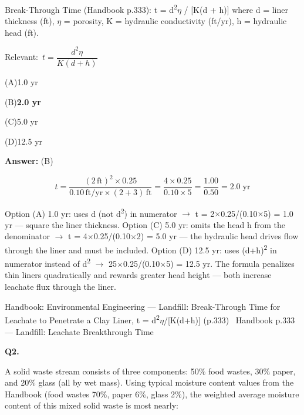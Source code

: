 \documentclass[11pt]{article}
\newcommand{\correct}[1]{\textbf{#1}\;{\color{accent}$\checkmark$}}
\newcommand{\optline}[2]{\par\noindent\hspace{1.2em}(#1)\hspace{0.6em}#2}
\begin{document}
Break-Through Time (Handbook p.333):
t = d\textsuperscript{2}$\eta$ / [K(d + h)]
where d = liner thickness (ft), $\eta$ = porosity, K = hydraulic conductivity (ft/yr), h = hydraulic head (ft).\par\vspace{3pt}
{\small\color{soft}Relevant:}\ $t = \dfrac{d^2 \eta}{K(d + h)}$\par\vspace{3pt}
\optline{A}{1.0 yr}
\optline{B}{\correct{2.0 yr}}
\optline{C}{5.0 yr}
\optline{D}{12.5 yr}
\par\vspace{3pt}
\vspace{2pt}\par\noindent\colorbox{boxbg}{\parbox{\dimexpr\linewidth-2\fboxsep\relax}{%
\vspace{2pt}\textbf{Answer:} (B)\par\vspace{2pt}
{\small \[t = \frac{(2\,\text{ft})^2 \times 0.25}{0.10\,\text{ft/yr}\times(2+3)\,\text{ft}} = \frac{4 \times 0.25}{0.10 \times 5} = \frac{1.00}{0.50} = 2.0\;\text{yr}\]

Option (A) 1.0 yr: uses d (not d\textsuperscript{2}) in numerator $\rightarrow$ t = 2$\times$0.25/(0.10$\times$5) = 1.0 yr --- square the liner thickness. Option (C) 5.0 yr: omits the head h from the denominator $\rightarrow$ t = 4$\times$0.25/(0.10$\times$2) = 5.0 yr --- the hydraulic head drives flow through the liner and must be included. Option (D) 12.5 yr: uses (d+h)\textsuperscript{2} in numerator instead of d\textsuperscript{2} $\rightarrow$ 25$\times$0.25/(0.10$\times$5) = 12.5 yr. The formula penalizes thin liners quadratically and rewards greater head height --- both increase leachate flux through the liner.}\par\vspace{2pt}
{\footnotesize\color{soft}Handbook: Environmental Engineering --- Landfill: Break-Through Time for Leachate to Penetrate a Clay Liner, t = d\textsuperscript{2}$\eta$/[K(d+h)] (p.333) \textbullet\ Handbook p.333 --- Landfill: Leachate Breakthrough Time}\vspace{2pt}
}}
\vspace{9pt}
\filbreak
\textbf{\color{accent}Q2.}\par\vspace{2pt}
A solid waste stream consists of three components: 50\% food wastes, 30\% paper, and 20\% glass (all by wet mass). Using typical moisture content values from the Handbook (food wastes 70\%, paper 6\%, glass 2\%), the weighted average moisture content of this mixed solid waste is most nearly:
\end{document}
